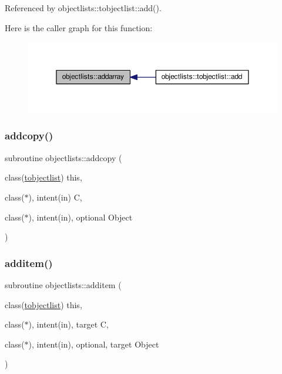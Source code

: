 Referenced by objectlists\+::tobjectlist\+::add().

Here is the caller graph for this function\+:
\nopagebreak
\begin{figure}[H]
\begin{center}
\leavevmode
\includegraphics[width=350pt]{namespaceobjectlists_aff0d8c1f6bf740fa33ba6c02cca08daf_icgraph}
\end{center}
\end{figure}
\mbox{\label{namespaceobjectlists_a2487c78e7548dc0d57e860dc447fc9f2}} 
\subsubsection{\texorpdfstring{addcopy()}{addcopy()}}
{\footnotesize\ttfamily subroutine objectlists\+::addcopy (\begin{DoxyParamCaption}\item[{class(\mbox{\hyperlink{structobjectlists_1_1tobjectlist}{tobjectlist}})}]{this,  }\item[{class($\ast$), intent(in)}]{C,  }\item[{class($\ast$), intent(in), optional}]{Object }\end{DoxyParamCaption})\hspace{0.3cm}{\ttfamily [private]}}

\mbox{\label{namespaceobjectlists_a36d198e7276f781aed81d70840e2f9da}} 
\subsubsection{\texorpdfstring{additem()}{additem()}}
{\footnotesize\ttfamily subroutine objectlists\+::additem (\begin{DoxyParamCaption}\item[{class(\mbox{\hyperlink{structobjectlists_1_1tobjectlist}{tobjectlist}})}]{this,  }\item[{class($\ast$), intent(in), target}]{C,  }\item[{class($\ast$), intent(in), optional, target}]{Object }\end{DoxyParamCaption})\hspace{0.3cm}{\ttfamily [private]}}



